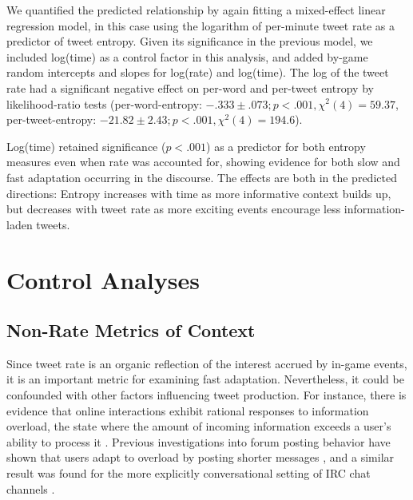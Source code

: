 \documentclass[11pt,letterpaper]{article}
\begin{document}

We quantified the predicted relationship by again fitting a mixed-effect linear regression model, in this case using the logarithm of per-minute tweet rate as a predictor of tweet entropy.  Given its significance in the previous model, we included log(time) as a control factor in this analysis, and added by-game random intercepts and slopes for log(rate) and log(time).  The log of the tweet rate had a significant negative effect on per-word and per-tweet entropy by likelihood-ratio tests (per-word-entropy: $-.333 \pm .073; p<.001, \chi^2(4)=59.37$, per-tweet-entropy: $-21.82 \pm 2.43; p<.001, \chi^2(4)=194.6$). 

Log(time) retained significance ($p<.001$) as a predictor for both entropy measures even when rate was accounted for, showing evidence for both slow and fast adaptation occurring in the discourse.  The effects are both in the predicted directions: Entropy increases with time as more informative context builds up, but decreases with tweet rate as more exciting events encourage less information-laden tweets.

\section{Control Analyses}

\subsection{Non-Rate Metrics of Context}\label{sect:other-metrics}

Since tweet rate is an organic reflection of the interest accrued by in-game events, it is an important metric for examining fast adaptation. Nevertheless, it could be confounded with other factors influencing tweet production.  For instance, there is evidence that online interactions exhibit rational responses to information overload, the state where the amount of incoming information exceeds a user's ability to process it \cite{miller1956,schoberth2003}.  Previous investigations into forum posting behavior have shown that users adapt to overload by posting shorter messages \cite{jones2001a,jones2001b,whittaker2003,schoberth2003}, and a similar result was found for the more explicitly conversational setting of IRC chat channels \cite{jones2008}.   
\end{document}
